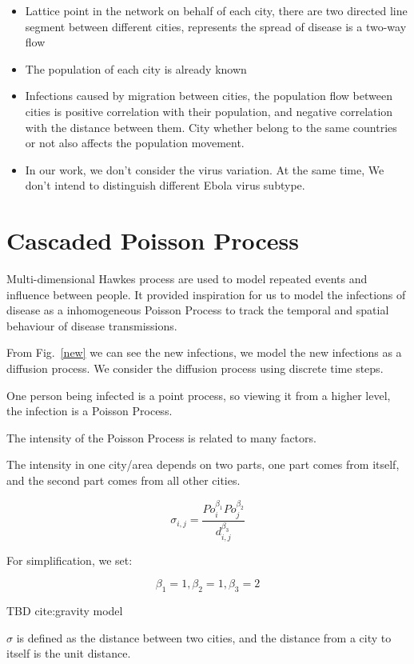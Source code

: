 \documentclass[12pt]{article}
\begin{document}
\begin{itemize}

\item	Lattice point in the network on behalf of each city, there are two directed line segment between different cities, represents the spread of disease is a two-way flow
\item	The population of each city is already known
\item	Infections caused by migration between cities, the population flow between cities is positive correlation with their population, and negative correlation with the distance between them. City whether belong to the same countries or not also affects the population movement.
\item	In our work, we don’t consider the virus variation. At the same time, We don't intend to distinguish different Ebola virus subtype.



\end{itemize}
\section{Cascaded Poisson Process}
Multi-dimensional Hawkes process\cite{zhou2013learning} are used to model repeated events and influence between people. It provided inspiration for us to model the infections of disease as a inhomogeneous Poisson Process to track the temporal and spatial behaviour of disease transmissions.

From Fig.~\ref{new} we can see the new infections, we model the new infections as a diffusion process. We consider the diffusion process using discrete time steps.

One person being infected is a point process, so viewing it from a higher level, the infection is a Poisson Process.

The intensity of the Poisson Process is related to many factors. 

The intensity in one city/area depends on two parts, one part comes from itself, and the second part comes from all other cities. 


$$\sigma_{i,j} = \frac{Po_i^{\beta_1}Po_j^{\beta_2}}{d_{i,j}^{\beta_3}}$$


For simplification, we set:

$$\beta_1 = 1, \beta_2 = 1, \beta_3 = 2$$

TBD cite:gravity model

$\sigma$ is defined as the distance between two cities, and the distance from a city to itself is the unit distance. 
\end{document}
